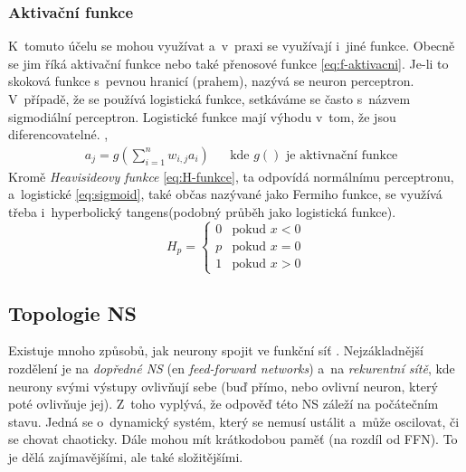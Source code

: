 \documentclass[12pt,oneside]{report}			%
\begin{document}
	\subsubsection{Aktivační funkce}
	K~tomuto účelu se mohou využívat a~v~praxi se využívají i~jiné funkce. Obecně se jim říká aktivační funkce nebo také přenosové funkce \eqref{eq:f-aktivacni}. Je-li to skoková funkce s~pevnou hranicí (prahem), nazývá se neuron perceptron. V~případě, že se používá logistická funkce, setkáváme se často s~názvem sigmodiální perceptron. Logistické funkce mají výhodu v~tom, že jsou diferencovatelné. \parencite[\gls{str} 728-729]{AIAMA}, \parencite[\gls{str} 36]{NN_introduction-Kriessel}\\
	\begin{align}
	\label{eq:f-aktivacni}
	& a_j = g\left(\sum_{i=1}^{n} w_{i,j} a_i\right) && \text{kde $g()$ je aktivnační funkce}
	\end{align}
	Kromě \emph{Heavisideovy funkce} \parencite{wiki:H-funkce} \eqref{eq:H-funkce}, ta odpovídá normálnímu perceptronu, a~logistické \ref{eq:sigmoid}, také občas nazývané jako Fermiho funkce, se využívá třeba i~hyperbolický tangens(podobný průběh jako logistická funkce). \parencite[\gls{str} 37-38]{NN_introduction-Kriessel}
	\begin{equation}
	\label{eq:H-funkce}
	 H_p = 
		\begin{cases}
		0 & \text{pokud $x<0$}\\
		p & \text{pokud $x=0$}\\
		1 & \text{pokud $x>0$}
		\end{cases}
	\end{equation}
	\subsection{Topologie \gls{NS}}
	\label{sec:NN-topo}
	Existuje mnoho způsobů, jak neurony spojit ve funkční síť  \parencite{NN-zoo}. Nejzákladnější rozdělení je na \emph{dopředné \gls{NS}} (\gls{en} \emph{feed-forward networks}) a~na \emph{rekurentní sítě}, kde neurony svými výstupy ovlivňují sebe (buď přímo, nebo ovlivní neuron, který poté ovlivňuje jej). Z~toho vyplývá, že odpověď této \gls{NS} záleží na počátečním stavu. Jedná se o~dynamický systém, který se nemusí ustálit a~může oscilovat, či se chovat chaoticky. Dále mohou mít krátkodobou paměť (na rozdíl od \gls{FFN}). To je dělá zajímavějšími, ale také složitějšími. \parencite[\gls{str} 729]{AIAMA}\\
\end{document}
